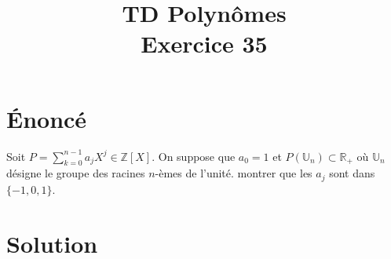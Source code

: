 \documentclass[french]{article}
\title{TD Polynômes \\ Exercice 35}
\date{}
\newcommand{\Z}{\mathbb{Z}}
\newcommand{\R}{\mathbb{R}}
\newcommand{\U}{\mathbb{U}}
\begin{document}
\maketitle

\section{Énoncé}
Soit $P=\displaystyle\sum_{k=0}^{n-1}a_jX^j\in\Z[X]$. On suppose que $a_0=1$ et $P(\U_n)\subset\R_+$ où $\U_n$ désigne le groupe des racines $n$-èmes de l'unité. montrer que les $a_j$ sont dans $\{-1,0,1\}$.
\section{Solution}
\end{document}
